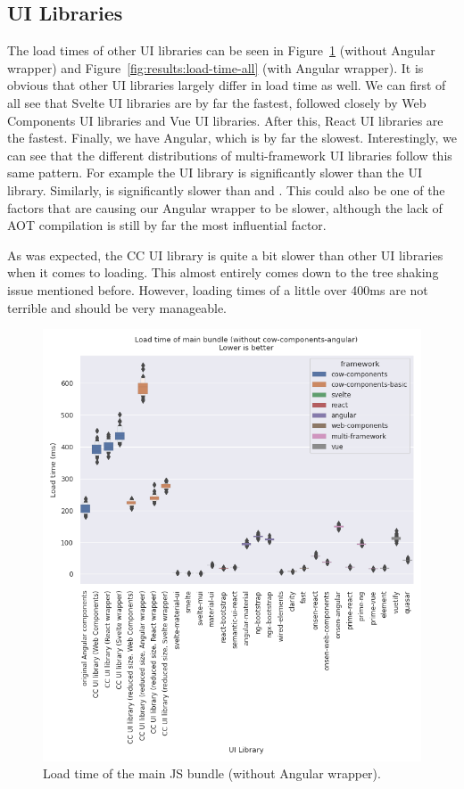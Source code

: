 \subsection{UI Libraries}
The load times of other UI libraries can be seen in Figure~\ref{fig:results:load-time-all-no-angular} (without Angular wrapper) and Figure~\ref{fig:results:load-time-all} (with Angular wrapper). It is obvious that other UI libraries largely differ in load time as well. We can first of all see that Svelte UI libraries are by far the fastest, followed closely by Web Components UI libraries and Vue UI libraries. After this, React UI libraries are the fastest. Finally, we have Angular, which is by far the slowest. Interestingly, we can see that the different distributions of multi-framework UI libraries follow this same pattern. For example the  UI library is significantly slower than the  UI library. Similarly,  is significantly slower than  and . This could also be one of the factors that are causing our Angular wrapper to be slower, although the lack of AOT compilation is still by far the most influential factor.

As was expected, the CC UI library is quite a bit slower than other UI libraries when it comes to loading. This almost entirely comes down to the tree shaking issue mentioned before. However, loading times of a little over 400ms are not terrible and should be very manageable.

\begin{figure}[h]
  \includegraphics[width=\columnwidth]{plots/load-time-all-no-angular.png}
  \caption{Load time of the main JS bundle (without Angular wrapper).}
  \label{fig:results:load-time-all-no-angular}
  \centering
\end{figure}

